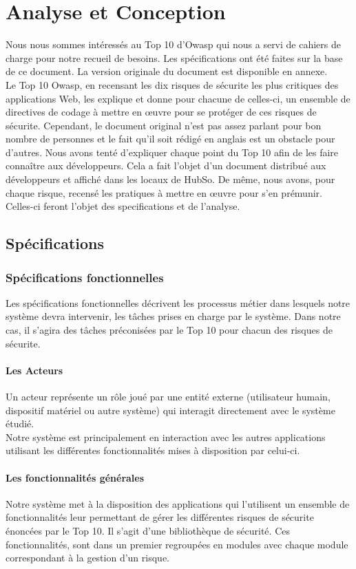 \chapter{Analyse et Conception}
Nous nous sommes intéressés au Top 10 d'Owasp qui nous a servi de cahiers de charge pour notre recueil de besoins. Les spécifications ont été faites sur la base de ce document. La version originale du document est disponible en annexe.\\
Le Top 10 Owasp, en recensant les dix risques de sécurite les plus critiques des applications Web, les explique et donne pour chacune de celles-ci, un ensemble de directives de codage à mettre en œuvre pour se protéger de ces risques de sécurite. Cependant, le document original n'est pas assez parlant pour bon nombre de personnes et le fait qu'il soit rédigé en anglais est un obstacle pour d'autres. Nous avons tenté d'expliquer chaque point du Top 10 afin de les faire connaître aux développeurs. Cela a fait l'objet d'un document distribué aux développeurs et affiché dans les locaux de HubSo. De même, nous avons, pour chaque risque, recensé les pratiques à mettre en œuvre pour s'en prémunir. Celles-ci feront l'objet des specifications et de l'analyse.

\section{Spécifications}

\subsection{Spécifications fonctionnelles}
Les spécifications fonctionnelles décrivent les processus métier dans lesquels notre système devra intervenir, les tâches prises en charge par le système. Dans notre cas, il s'agira des tâches préconisées par le Top 10 pour chacun des risques de sécurite. 

\subsubsection{Les Acteurs}
Un acteur représente un rôle joué par une entité externe (utilisateur humain, dispositif matériel ou autre système) qui interagit directement avec le système étudié.\\
Notre système est principalement en interaction avec les autres applications utilisant les différentes fonctionnalités mises à disposition par celui-ci. 

\subsubsection{Les fonctionnalités générales}
Notre système met à la disposition des applications qui l'utilisent un ensemble de fonctionnalités leur permettant de gérer les différentes risques de sécurite énoncées par le Top 10. Il s'agit d'une bibliothèque de sécurité. Ces fonctionnalités, sont dans un premier regroupées en modules avec chaque module correspondant à la gestion d'un risque.

